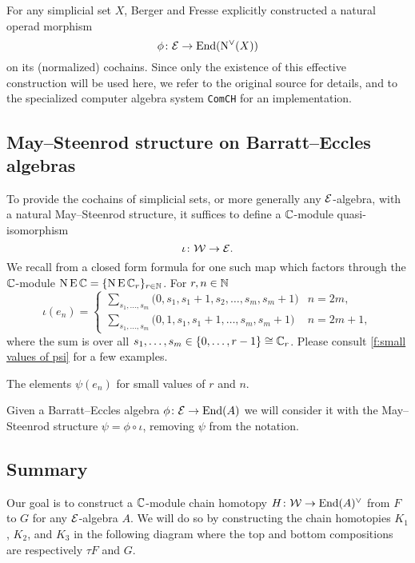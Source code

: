 For any simplicial set $X$, Berger and Fresse explicitly constructed a natural operad morphism
\[
\phi \colon \mathcal{E} \to \mathrm{End}(\operatorname{N^{\vee}}(X))
\]
on its (normalized) cochains.
Since only the existence of this effective construction will be used here, we refer to the original source for details, and to the specialized computer algebra system \texttt{ComCH} for an implementation.

\subsection{May--Steenrod structure on Barratt--Eccles algebras}

To provide the cochains of simplicial sets, or more generally any $\mathcal{E}$-algebra, with a natural May--Steenrod structure, it suffices to define a $\mathbb{C}$-module quasi-isomorphism
\[
\iota \colon \mathcal{W} \to \mathcal{E}.
\]
We recall from \cite{medina2021may_st} a closed form formula for one such map which factors through the $\mathbb{C}$-module $\operatorname{N}\operatorname{E}\mathbb{C} = \{\operatorname{N}\operatorname{E}\mathbb{C}_r\}_{r\in\mathbb{N}}$.
For $r,n\in\mathbb{N}$
\begin{equation*}
	\iota(e_{n}) =
	\begin{cases}
		\displaystyle{\sum_{s_1, \dots, s_m}} \big(0, {s_1}, {s_1+1}, {s_2}, \dots, {s_{m}}, {s_{m}+1} \big) & n = 2m, \\
		\displaystyle{\sum_{s_1, \dots, s_m}} \big(0, 1, {s_1}, {s_1+1}, \dots, {s_{m}}, {s_{m}+1} \big) & n = 2m+1,
	\end{cases}
\end{equation*}
where the sum is over all $s_1, \dots, s_m \in \{0, \dots, r-1\} \cong \mathbb{C}_r$.
Please consult \cref{f:small values of psi} for a few examples.

\begin{table}
	\centering
	
	\caption{The elements $\psi(e_n)$ for small values of $r$ and $n$.}
	\label{f:small values of psi}
\end{table}

Given a Barratt--Eccles algebra $\phi \colon \mathcal{E} \to \mathrm{End}(A)$ we will consider it with the May--Steenrod structure $\psi = \phi \circ \iota$, removing $\psi$ from the notation.

\subsection{Summary}

Our goal is to construct a $\mathbb{C}$-module chain homotopy $H \colon \mathcal{W} \to \mathrm{End}(A)^\vee$ from $F$ to $G$ for any $\mathcal{E}$-algebra $A$.
We will do so by constructing the chain homotopies $K_1$, $K_2$, and $K_3$ in the following diagram where the top and bottom compositions are respectively $\tau F$ and $G$.

